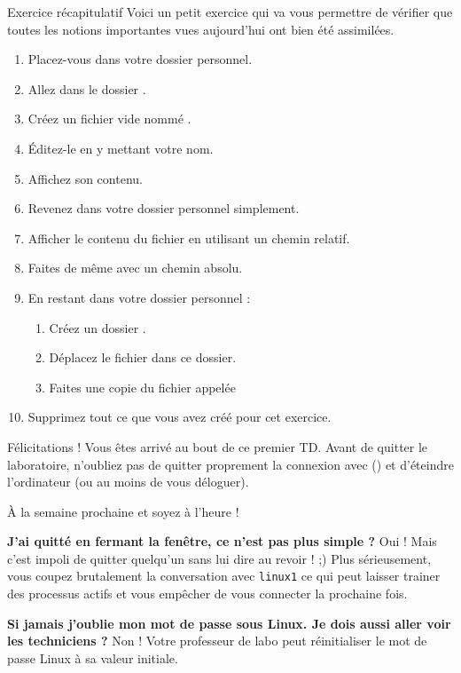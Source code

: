\documentclass[a4paper,11pt]{style-esi/td}
\begin{document}
	\begin{Exercice}{Exercice récapitulatif}
		Voici un petit exercice qui va vous permettre de vérifier
		que toutes les notions importantes vues aujourd'hui
		ont bien été assimilées.
		\begin{enumerate}
			\item Placez-vous dans votre dossier personnel.
			\item Allez dans le dossier .
			\item Créez un fichier vide nommé .
			\item Éditez-le en y mettant votre nom.
			\item Affichez son contenu.
			\item Revenez dans votre dossier personnel simplement.
			\item Afficher le contenu du fichier 
				en utilisant un chemin relatif.
			\item Faites de même avec un chemin absolu.
			\item En restant dans votre dossier personnel :
			\begin{enumerate}
				\item Créez un dossier .
				\item Déplacez le fichier  dans ce dossier.
				\item Faites une copie du fichier 
					appelée 
			\end{enumerate}
			\item Supprimez tout ce que vous avez créé pour cet exercice.
		\end{enumerate}
	\end{Exercice}

	\bigskip
	\begin{infotbox}{Félicitations !} 
		Vous êtes arrivé au bout de ce premier TD.
		Avant de quitter le laboratoire, n'oubliez pas de quitter proprement 
		la connexion avec  () 
		et d'éteindre l'ordinateur (ou au moins de vous déloguer).

		À la semaine prochaine et soyez à l'heure !
	\end{infotbox}

	\begin{faq}
	\textbf{J'ai quitté en fermant la fenêtre, ce n'est pas plus simple ?}
	Oui ! Mais c'est impoli de quitter quelqu'un sans lui dire au revoir ! ;) 
	Plus sérieusement, vous coupez brutalement la conversation avec \texttt{linux1} 
	ce qui peut laisser trainer des processus actifs et vous empêcher de vous connecter la prochaine fois.
							
	\medskip
	\textbf{Si jamais j'oublie mon mot de passe sous Linux. Je dois aussi aller voir les techniciens ?}			
	Non ! Votre professeur de labo peut réinitialiser le mot de passe Linux à sa valeur initiale.
	\end{faq}
\end{document}
